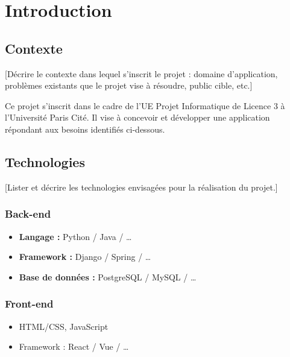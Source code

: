\documentclass[12pt, a4paper]{article}
\begin{document}
\makecoverpage

\makesommaire

\section{Introduction}

\subsection{Contexte}

[Décrire le contexte dans lequel s'inscrit le projet : domaine d'application,
problèmes existants que le projet vise à résoudre, public cible, etc.]

Ce projet s'inscrit dans le cadre de l'UE Projet Informatique de Licence 3 à
l'Université Paris Cité. Il vise à concevoir et développer une application
répondant aux besoins identifiés ci-dessous.

\subsection{Technologies}

[Lister et décrire les technologies envisagées pour la réalisation du projet.]

\subsubsection{Back-end}

\begin{itemize}
  \item \textbf{Langage :} Python / Java / \ldots
  \item \textbf{Framework :} Django / Spring / \ldots
  \item \textbf{Base de données :} PostgreSQL / MySQL / \ldots
\end{itemize}

\subsubsection{Front-end}

\begin{itemize}
  \item HTML/CSS, JavaScript
  \item Framework : React / Vue / \ldots
\end{itemize}
\end{document}

